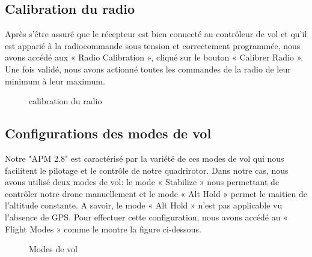 	
	\newpage
	\subsection{Calibration du radio}
	Après s’être assuré que le récepteur est bien connecté au contrôleur de vol et qu’il est apparié à la radiocommande sous tension et correctement programmée, nous avons  accédé aux « Radio
	Calibration », cliqué sur le bouton « Calibrer Radio ». 
	Une fois validé, nous avons actionné toutes les commandes de la radio de leur minimum à leur maximum. 
	\begin{figure} [h]
		\begin{center}
			\centering
		\end{center}
		\caption{calibration du radio}
	\end{figure}
	
	\subsection{Configurations des modes de vol} 
	Notre "APM 2.8" est caractérisé par la variété de ces modes de vol qui nous facilitent le pilotage et le contrôle de notre quadrirotor. Dans notre cas, nous avons utilisé deux modes de vol: le mode « Stabilize » nous permettant de contrôler notre drone manuellement et le mode « Alt Hold » permet le maitien de l'altitude constante. A savoir, le mode « Alt Hold » n'est pas applicable vu l'absence de GPS. Pour effectuer  cette configuration, nous avons accédé au « Flight Modes » comme le montre la figure ci-dessous.
	
	\begin{figure} [h]
		\begin{center}
			\centering
		\end{center}
		\caption{Modes de vol}
	\end{figure}
	\newpage
